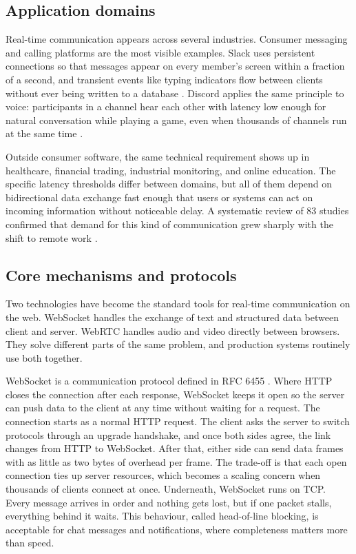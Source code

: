 \documentclass[12pt,a4paper]{article}
\begin{document}
\subsection{Application domains}

Real-time communication appears across several industries. Consumer messaging and calling platforms are the most visible examples. Slack uses persistent connections so that messages appear on every member's screen within a fraction of a second, and transient events like typing indicators flow between clients without ever being written to a database \citep{thangudu2023}. Discord applies the same principle to voice: participants in a channel hear each other with latency low enough for natural conversation while playing a game, even when thousands of channels run at the same time \citep{vass2018}.

Outside consumer software, the same technical requirement shows up in healthcare, financial trading, industrial monitoring, and online education. The specific latency thresholds differ between domains, but all of them depend on bidirectional data exchange fast enough that users or systems can act on incoming information without noticeable delay. A systematic review of 83 studies confirmed that demand for this kind of communication grew sharply with the shift to remote work \citep{abozariba2025}.

\subsection{Core mechanisms and protocols}

Two technologies have become the standard tools for real-time communication on the web. WebSocket handles the exchange of text and structured data between client and server. WebRTC handles audio and video directly between browsers. They solve different parts of the same problem, and production systems routinely use both together.

WebSocket is a communication protocol defined in RFC 6455 \citep{fette2011}. Where HTTP closes the connection after each response, WebSocket keeps it open so the server can push data to the client at any time without waiting for a request. The connection starts as a normal HTTP request. The client asks the server to switch protocols through an upgrade handshake, and once both sides agree, the link changes from HTTP to WebSocket. After that, either side can send data frames with as little as two bytes of overhead per frame. The trade-off is that each open connection ties up server resources, which becomes a scaling concern when thousands of clients connect at once. Underneath, WebSocket runs on TCP. Every message arrives in order and nothing gets lost, but if one packet stalls, everything behind it waits. This behaviour, called head-of-line blocking, is acceptable for chat messages and notifications, where completeness matters more than speed.
\end{document}
